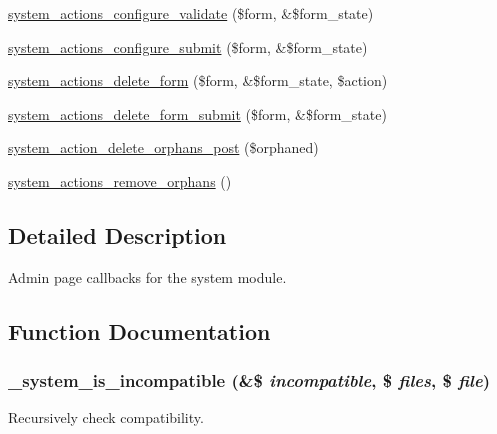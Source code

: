 \begin{DoxyCompactItemize}
\item 
\hyperlink{system_8admin_8inc_aca39f7ce5afb5a3bc6b0c8bffe7b5b38}{system\_\-actions\_\-configure\_\-validate} (\$form, \&\$form\_\-state)
\item 
\hyperlink{system_8admin_8inc_aaa09c25e2a3e4fbe3ca126733cdd62c8}{system\_\-actions\_\-configure\_\-submit} (\$form, \&\$form\_\-state)
\item 
\hyperlink{group__forms_ga50d446212b0733af3d5248645233889b}{system\_\-actions\_\-delete\_\-form} (\$form, \&\$form\_\-state, \$action)
\item 
\hyperlink{system_8admin_8inc_ad081e1fe2621d62873254449a097f2e7}{system\_\-actions\_\-delete\_\-form\_\-submit} (\$form, \&\$form\_\-state)
\item 
\hyperlink{system_8admin_8inc_acb4d8f440d314f1bc082acdbcb41fdd5}{system\_\-action\_\-delete\_\-orphans\_\-post} (\$orphaned)
\item 
\hyperlink{system_8admin_8inc_aedf53f626d9575e7b779f6d5830e3cf5}{system\_\-actions\_\-remove\_\-orphans} ()
\end{DoxyCompactItemize}


\subsection{Detailed Description}
Admin page callbacks for the system module. 

\subsection{Function Documentation}
\hypertarget{system_8admin_8inc_ad026206dcc488d13c621043f8f6312dd}{
\subsubsection[{\_\-system\_\-is\_\-incompatible}]{\setlength{\rightskip}{0pt plus 5cm}\_\-system\_\-is\_\-incompatible (\&\$ {\em incompatible}, \/  \$ {\em files}, \/  \$ {\em file})}}
\label{system_8admin_8inc_ad026206dcc488d13c621043f8f6312dd}
Recursively check compatibility.


